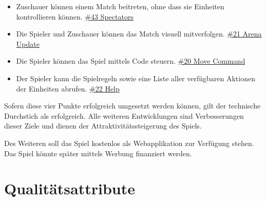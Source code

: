 \documentclass[a4paper, 11pt]{scrartcl}
\let\oldsection\section
\renewcommand\section{\clearpage\oldsection}
\begin{document}
\begin{itemize}
  \item Zuschauer können einem Match beitreten, ohne dass sie Einheiten kontrollieren können. \href{https://dev.azure.com/schaumic/darwin/_workitems/edit/43/}{\#43 Spectators}
  \item Die Spieler und Zuschauer können das Match visuell mitverfolgen. \href{https://dev.azure.com/schaumic/darwin/_workitems/edit/21/}{\#21 Arena Update}
  \item Die Spieler können das Spiel mittels Code steuern. \href{https://dev.azure.com/schaumic/darwin/_workitems/edit/20/}{\#20 Move Command}
  \item Der Spieler kann die Spielregeln sowie eine Liste aller verfügbaren Aktionen der Einheiten abrufen. \href{https://dev.azure.com/schaumic/darwin/_workitems/edit/22/}{\#22 Help}
\end{itemize}

Sofern diese vier Punkte erfolgreich umgesetzt werden können, gilt der technische Durchstich als erfolgreich. Alle weiteren Entwicklungen sind Verbesserungen dieser Ziele und dienen der Attraktivitätssteigerung des Spiels.

Des Weiteren soll das Spiel kostenlos als Webapplikation zur Verfügung stehen. Das Spiel könnte später mittels Werbung finanziert werden.

\section{Qualitätsattribute}
\end{document}
